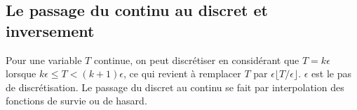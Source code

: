 \subsection{Le passage du continu au discret et inversement}
Pour une variable $T$ continue, on peut discrétiser en considérant que $T=k\epsilon$ lorsque $k\epsilon\leq T <(k+1)\epsilon$, ce qui revient à remplacer $T$ par $\epsilon\lfloor T/\epsilon\rfloor$. $\epsilon$ est le pas de discrétisation. Le passage du discret au continu se fait par interpolation des fonctions de survie ou de hasard.


